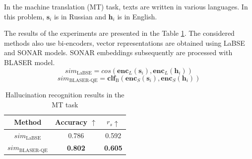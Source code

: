 \documentclass[11pt]{article}
\begin{document}
In the machine translation (MT) task, texts are written in various languages. In this problem, $\mathbf{s}_i$ is in Russian and $\mathbf{h}_i$ is in English.

The results of the experiments are presented in the Table \ref{tab:mt}. The considered methods also use bi-encoders, vector representations are obtained using LaBSE and SONAR \cite{Duquenne2023SONARSM} models. SONAR embeddings subsequently are processed with BLASER model. \[sim_\text{LaBSE} = cos (\mathbf{enc}_{L}(\mathbf{s}_i), \mathbf{enc}_{L}(\mathbf{h}_i))\] 
\[sim_\text{BLASER-QE} = \mathbf{clf}_\text{B} (\mathbf{enc}_{S}(\mathbf{s}_i), \mathbf{enc}_{S}(\mathbf{h}_i))\]

\begin{table}[]
    \centering
    \begin{tabular}{c|c c}
    Method & Accuracy $\uparrow$ & $r_s \uparrow$ \\
    \hline
    $sim_\text{LaBSE}$ & 0.786 & 0.592 \\
    $sim_\text{BLASER-QE}$ & \textbf{0.802} & \textbf{0.605} \\
    \end{tabular}
    \caption{Hallucination recognition results in the MT task}
    \label{tab:mt}
\end{table}



\end{document}
